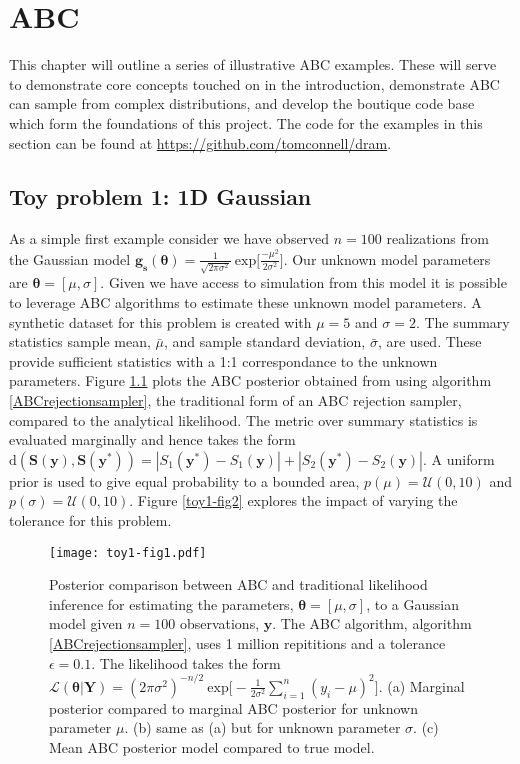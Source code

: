 \chapter{ABC}

This chapter will outline a series of illustrative ABC examples. These will serve to demonstrate core concepts touched on in the introduction, demonstrate ABC can sample from complex distributions, and develop the boutique code base which form the foundations of this project. The code for the examples in this section can be found at \url{https://github.com/tomconnell/dram}.\\

\section{Toy problem 1: 1D Gaussian}
As a simple first example consider we have observed $n = 100$ realizations from the Gaussian model $\bm{g_s}(\bm{\theta}) = \frac{1}{\sqrt{2\pi\sigma^2}}\ \text{exp}\Big[\frac{-\mu^2}{2\sigma^2}\Big]$. Our unknown model parameters are $\bm{\theta} = [\mu,\sigma]$. Given we have access to simulation from this model it is possible to leverage ABC algorithms to estimate these unknown model parameters. A synthetic dataset for this problem is created with $\mu = 5$ and $\sigma = 2$. The summary statistics sample mean, $\bar{\mu}$, and sample standard deviation, $\bar{\sigma}$, are used. These provide sufficient statistics with a 1:1 correspondance to the unknown parameters. Figure \ref{toy1-fig1} plots the ABC posterior obtained from using algorithm \ref{ABCrejectionsampler}, the traditional form of an ABC rejection sampler, compared to the analytical likelihood. The metric over summary statistics is evaluated marginally and hence takes the form $\text{d}(\bm{S}(\bm{y}),\bm{S}(\bm{y^*})) = |S_1(\bm{y^*}) - S_1(\bm{y})| +| S_2(\bm{y^*}) - S_2(\bm{y})|$. A uniform prior is used to give equal probability to a bounded area, $p(\mu) = \mathcal{U}(0,10)$ and $p(\sigma) = \mathcal{U}(0,10)$. 
Figure \ref{toy1-fig2} explores the impact of varying the tolerance for this problem.\\

\begin{figure}[H]
	\centering
	\texttt{[image: toy1-fig1.pdf]}
	\caption{Posterior comparison between ABC and traditional likelihood inference for estimating the parameters, $\bm{\theta} = [\mu,\sigma]$, to a Gaussian model given $n = 100$ observations, $\bm{y}$. The ABC algorithm, algorithm \ref{ABCrejectionsampler}, uses 1 million repititions and a tolerance $\epsilon = 0.1$. The likelihood takes the form $\mathcal{L}(\bm{\theta}|\bm{Y}) = (2\pi\sigma^2)^{-n/2}\ \text{exp}\big[-\frac{1}{2\sigma^2}\sum_{i = 1}^{n}(y_i-\mu)^2\big]$. (a) Marginal posterior compared to marginal ABC posterior for unknown parameter $\mu$. (b) same as (a) but for unknown parameter $\sigma$. (c) Mean ABC posterior model compared to true model.}
	\label{toy1-fig1}
\end{figure}

